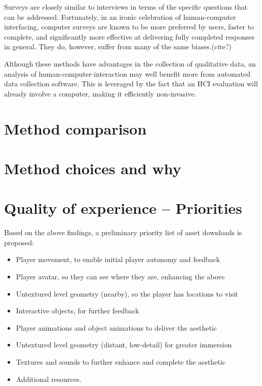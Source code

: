 \documentclass{scrartcl}
\begin{document}
Surveys are closely similar to interviews in terms of the specific questions that can be addressed. Fortunately, in an ironic celebration of human-computer interfacing, computer surveys are known to be more preferred by users, faster to complete, and significantly more effective at delivering fully completed responses in general. \cite{computersurveys} They do, however, suffer from many of the same biases.(cite?)

Although these methods have advantages in the collection of qualitative data, an analysis of human-computer-interaction may well benefit more from automated data collection software. This is leveraged by the fact that an HCI evaluation will already involve a computer, making it efficiently non-invasive.

\section{Method comparison}

\section{Method choices and why}

\section{Quality of experience -- Priorities}
Based on the above findings, a preliminary priority list of asset downloads is proposed:

\begin{itemize}
	\item Player movement, to enable initial player autonomy and feedback \cite{motivation}
	\item Player avatar, so they can see where they are, enhancing the above
	\item Untextured level geometry (nearby), so the player has locations to visit
	\item Interactive objects, for further feedback
	\item Player animations and object animations to deliver the aesthetic \cite{graphicsvsexperience}
	\item Untextured level geometry (distant, low-detail) for greater immersion
	\item Textures and sounds to further enhance and complete the aesthetic
	\item Additional resources.
\end{itemize}
\end{document}
